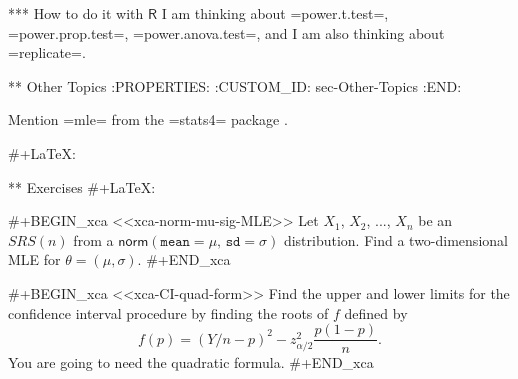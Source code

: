 *** How to do it with \(\mathsf{R}\)
I am thinking about =power.t.test=, =power.prop.test=,
=power.anova.test=, and I am also thinking about =replicate=.

** Other Topics
:PROPERTIES:
:CUSTOM_ID: sec-Other-Topics
:END:

Mention =mle= from the =stats4= package \cite{stats4}.

#+LaTeX: \newpage{}

** Exercises
#+LaTeX: \setcounter{thm}{0}

#+BEGIN_xca
<<xca-norm-mu-sig-MLE>> Let \(X_{1}\), \(X_{2}\), ..., \(X_{n}\) be an
\(SRS(n)\) from a \(\mathsf{norm}(\mathtt{mean} = \mu, \, \mathtt{sd}
= \sigma)\) distribution. Find a two-dimensional MLE for
\(\theta=(\mu,\sigma)\).
#+END_xca

#+BEGIN_xca
<<xca-CI-quad-form>> Find the upper and lower limits for the
confidence interval procedure by finding the roots of \(f\) defined by
\[ f(p)=\left(Y/n-p\right)^{2}-z_{\alpha/2}^{2}\frac{p(1-p)}{n}.  \]
You are going to need the quadratic formula.
#+END_xca
